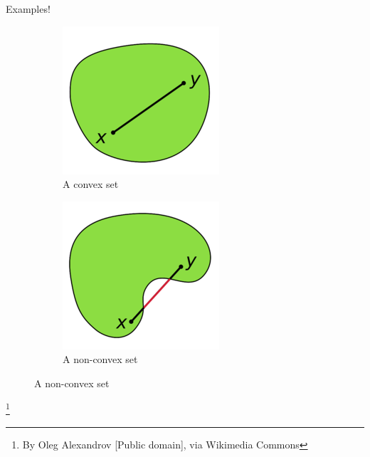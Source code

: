 \documentclass{beamer}
\begin{document}
\begin{frame}{Examples!}
\begin{figure}
\centering
\begin{subfigure}{.5\textwidth}
  \centering
  \includegraphics[width=.4\linewidth]{imgs/convex.png}
  \caption{A convex set}
  \label{fig:sub1}
\end{subfigure}%
\begin{subfigure}{.5\textwidth}
  \centering
  \includegraphics[width=.4\linewidth]{imgs/notconvex.png}
  \caption{A non-convex set}
  \label{fig:sub2}
\end{subfigure}

\label{fig:test}
\end{figure}

\footnote{By Oleg Alexandrov [Public domain], via Wikimedia Commons}
\end{frame}
\end{document}

